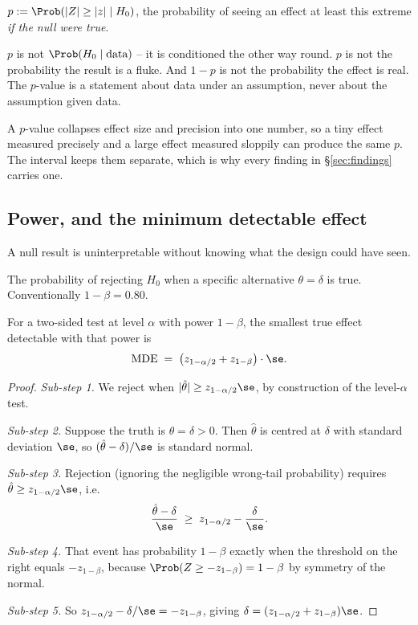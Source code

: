 \begin{definition}[$p$-value]
$p := \Prob(|Z| \ge |z| \mid H_0)$, the probability of seeing an effect at least
this extreme \emph{if the null were true}.
\end{definition}

\begin{remark}
$p$ is not $\Prob(H_0 \mid \text{data})$ -- it is conditioned the other way round.
$p$ is not the probability the result is a fluke. And $1-p$ is not the
probability the effect is real. The $p$-value is a statement about data under an
assumption, never about the assumption given data.
\end{remark}

\begin{remark}
A $p$-value collapses effect size and precision into one number, so a tiny effect
measured precisely and a large effect measured sloppily can produce the same $p$.
The interval keeps them separate, which is why every finding in §\ref{sec:findings}
carries one.
\end{remark}

\subsection{Power, and the minimum detectable effect}
\label{sec:mde}

A null result is uninterpretable without knowing what the design could have seen.

\begin{definition}[Power]
The probability of rejecting $H_0$ when a specific alternative $\theta = \delta$
is true. Conventionally $1-\beta = 0.80$.
\end{definition}

\begin{theorem}
\label{thm:mde}
For a two-sided test at level $\alpha$ with power $1-\beta$, the smallest true
effect detectable with that power is
\[
\mathrm{MDE} \;=\; \big(z_{1-\alpha/2} + z_{1-\beta}\big)\cdot \se .
\]
\end{theorem}
\begin{proof}
\emph{Sub-step 1.} We reject when $|\hat\theta| \ge z_{1-\alpha/2}\se$, by
construction of the level-$\alpha$ test.

\emph{Sub-step 2.} Suppose the truth is $\theta = \delta > 0$. Then
$\hat\theta$ is centred at $\delta$ with standard deviation $\se$, so
$(\hat\theta - \delta)/\se$ is standard normal.

\emph{Sub-step 3.} Rejection (ignoring the negligible wrong-tail probability)
requires $\hat\theta \ge z_{1-\alpha/2}\se$, i.e.
\[
\frac{\hat\theta-\delta}{\se} \;\ge\; z_{1-\alpha/2} - \frac{\delta}{\se}.
\]

\emph{Sub-step 4.} That event has probability $1-\beta$ exactly when the
threshold on the right equals $-z_{1-\beta}$, because
$\Prob(Z \ge -z_{1-\beta}) = 1-\beta$ by symmetry of the normal.

\emph{Sub-step 5.} So $z_{1-\alpha/2} - \delta/\se = -z_{1-\beta}$, giving
$\delta = (z_{1-\alpha/2}+z_{1-\beta})\se$.
\end{proof}

